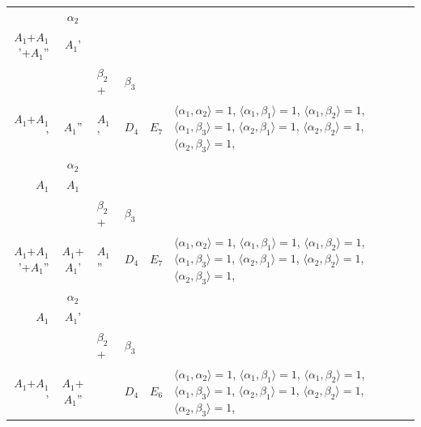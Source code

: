 \documentclass[12pt]{report}
\begin{document}
\begin{appendix}
{\begin{longtable}{rcl p{1cm}p{1cm}p{3cm} }
\begin{tabular}{cc}$\alpha_1$+ & $\alpha_2$\\\tiny{ $A_1$+$A_1$'+$A_1$'' } & \tiny{ $A_1$' }\end{tabular} &\begin{tabular}{c} = \\~ \end{tabular} & \begin{tabular}{ccc}$\beta_1$+ & $\beta_2$+ & $\beta_3$\\\tiny{ $A_1$+$A_1$' } & \tiny{ $A_1$'' } & \tiny{ $A_1$' }\end{tabular} & $D_4$ & $E_7$ & $\langle\alpha_1, \alpha_2\rangle=1$,  $\langle\alpha_1, \beta_1\rangle=1$, $\langle\alpha_1, \beta_2\rangle=1$, $\langle\alpha_1, \beta_3\rangle=1$, $\langle\alpha_2, \beta_1\rangle=1$, $\langle\alpha_2, \beta_2\rangle=1$, $\langle\alpha_2, \beta_3\rangle=1$, 
\\
\begin{tabular}{cc}$\alpha_1$+ & $\alpha_2$\\\tiny{ $A_1$ } & \tiny{ $A_1$ }\end{tabular} &\begin{tabular}{c} = \\~ \end{tabular} & \begin{tabular}{ccc}$\beta_1$+ & $\beta_2$+ & $\beta_3$\\\tiny{ $A_1$+$A_1$'+$A_1$'' } & \tiny{ $A_1$+$A_1$' } & \tiny{ $A_1$'' }\end{tabular} & $D_4$ & $E_7$ & $\langle\alpha_1, \alpha_2\rangle=1$,  $\langle\alpha_1, \beta_1\rangle=1$, $\langle\alpha_1, \beta_2\rangle=1$, $\langle\alpha_1, \beta_3\rangle=1$, $\langle\alpha_2, \beta_1\rangle=1$, $\langle\alpha_2, \beta_2\rangle=1$, $\langle\alpha_2, \beta_3\rangle=1$, 
\\
\begin{tabular}{cc}$\alpha_1$+ & $\alpha_2$\\\tiny{ $A_1$ } & \tiny{ $A_1$' }\end{tabular} &\begin{tabular}{c} = \\~ \end{tabular} & \begin{tabular}{ccc}$\beta_1$+ & $\beta_2$+ & $\beta_3$\\\tiny{ $A_1$+$A_1$' } & \tiny{ $A_1$+$A_1$'' } & \tiny{  }\end{tabular} & $D_4$ & $E_6$ & $\langle\alpha_1, \alpha_2\rangle=1$,  $\langle\alpha_1, \beta_1\rangle=1$, $\langle\alpha_1, \beta_2\rangle=1$, $\langle\alpha_1, \beta_3\rangle=1$, $\langle\alpha_2, \beta_1\rangle=1$, $\langle\alpha_2, \beta_2\rangle=1$, $\langle\alpha_2, \beta_3\rangle=1$, 

\end{longtable}}
\end{appendix}
\end{document}
